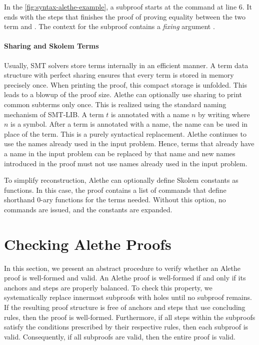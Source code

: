In the \cref{fig:syntax-alethe-example}, a subproof starts at the  command at line 6.
It ends with the  steps that finishes the proof of proving equality between the two term  and .
The context for the subproof  contains a \emph{fixing} argument .

\paragraph{Sharing and Skolem Terms}

Usually, SMT solvers store terms internally in an efficient manner.
A term data structure with perfect sharing ensures that every term is stored in memory precisely once.
When printing the proof, this compact storage is unfolded. This leads to a blowup of the proof size.
Alethe can optionally use sharing to print common subterms only once.
This is realized using the standard naming mechanism of SMT-LIB. A term $t$
is annotated with a name $n$ by writing  where $n$ is a symbol.
After a term is annotated with a name, the name can be used in place of the term.
This is a purely syntactical replacement.
Alethe continues to use the names already used in the input problem.
Hence, terms that already have a name in the input problem can be replaced by that name and new
names introduced in the proof must not use names already used in the input problem.

To simplify reconstruction, Alethe can optionally define Skolem constants as functions. In this case, the proof contains a list of
 commands that define shorthand $0$-ary functions for the  terms
needed. Without this option, no  commands are issued, and the constants are expanded.

\section{Checking Alethe Proofs}

In this section, we present an abstract procedure to verify whether an Alethe proof
is well-formed and valid. An Alethe proof is well-formed if and only if its anchors
and steps are properly balanced. To check this property, we systematically replace innermost
subproofs with holes until no subproof remains. If the resulting proof structure is
free of anchors and steps that use concluding rules, then the proof is well-formed.
Furthermore, if all steps within the subproofs satisfy the conditions prescribed by their
respective rules, then each subproof is valid. Consequently, if all subproofs are valid,
then the entire proof is valid.

